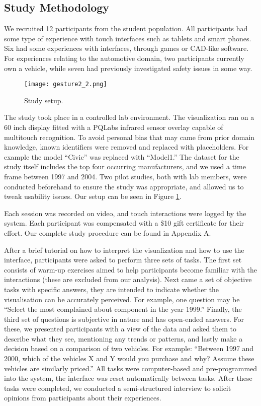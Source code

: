 \subsection{Study Methodology}
We recruited 12 participants from the student population. All participants had some
type of experience with touch interfaces such as tablets and smart phones. Six 
had some experiences with \threed interfaces, through games or CAD-like
software. For experiences relating to the automotive domain, two participants
currently own a vehicle, while seven had previously investigated safety issues in
some way. 
 
	\begin{figure}
	 \centering  
	 \texttt{[image: gesture2\_2.png]}  
	 \caption{Study setup.}
	 \label{figure:study}
	\end{figure}


The study took place in a controlled lab environment. The visualization ran on
a 60 inch display fitted with a PQLabs infrared sensor overlay capable of
multitouch recognition. To avoid personal bias that may came from prior domain
knowledge, known identifiers were removed and replaced with placeholders.
For example the model ``Civic'' was replaced with ``Model1.'' The dataset for
the study itself includes the top four occurring manufacturers, and we used a time
frame between 1997 and 2004. Two pilot studies, both with lab members, were
conducted beforehand to ensure the study was appropriate, and allowed us to
tweak usability issues. Our setup can be seen in Figure \ref{figure:study}.

Each session was recorded on video, and touch interactions were
logged by the system. Each participant was compensated with a \$10 gift
certificate for their effort. Our complete study procedure can be found in Appendix A.


After a brief tutorial on how to interpret the visualization and how to use the
interface, participants were asked to perform three sets of tasks. The first set
consists of warm-up exercises aimed to help participants become familiar with the 
interactions (these are excluded from our analysis). Next came a set of
objective tasks with specific answers, they are intended to indicate whether the
\threed visualisation can be accurately perceived. For example, one question may
be ``Select the most complained about component in the year 1999.'' Finally,
the third set of questions is subjective in nature and has open-ended answers.
For these, we presented participants with a view of the data and asked them to
describe what they see, mentioning any trends or patterns, and lastly make a
decision based on a comparison of two vehicles. For example: ``Between 1997 and
2000, which of the vehicles X and Y would you purchase and why? Assume these vehicles are
similarly priced.'' All tasks were computer-based and pre-programmed into the system, 
the interface was reset automatically between tasks. After these tasks were completed, 
we conducted a semi-structured interview to solicit opinions from participants about their experiences.  

